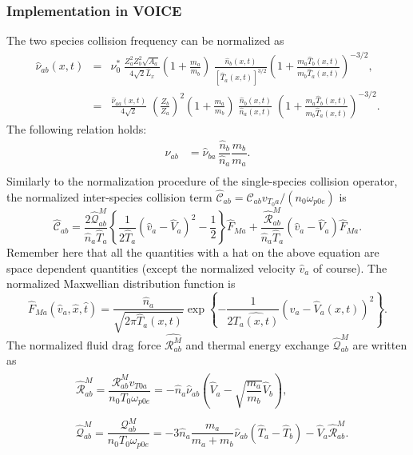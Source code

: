 \documentclass[11pt]{article}
\begin{document}
\subsubsection{Implementation in VOICE}
The two species collision frequency can be normalized as
%
\begin{eqnarray}
	\hat\nu_{ab}(x,t) 
    &=& \nu^*_0\; \frac{Z_a^2Z_b^2 \sqrt{A_a}}{4 \sqrt{2} \hat L_x} \left(1+\frac{m_a}{m_b}\right)\; 
        \frac{\hat n_b(x,t)}{[\hat T_a(x,t)]^{3/2}} 
        \left(1+\frac{m_a\hat T_b(x,t)}{m_b \hat T_a(x,t)}\right)^{-3/2}, \nonumber\\
    &=& \frac{\hat\nu_{aa}(x,t)}{4\sqrt{2}}\; \left(\frac{Z_b}{Z_a}\right)^2
        \left(1+\frac{m_a}{m_b}\right)\; 
        \frac{\hat n_b(x,t)}{\hat n_a(x,t)}\;
        \left(1+\frac{m_a\hat T_b(x,t)}{m_b \hat T_a(x,t)}\right)^{-3/2}.
\end{eqnarray}
%
The following relation holds:
%
\begin{align}
  \hat{\nu}_{ab} & = \hat{\nu}_{ba} \, \dfrac{\hat{n}_b}{\hat{n}_a}   \dfrac{m_b}{m_a}. \\
\end{align}
%
Similarly to the normalization procedure of the single-species collision operator, the normalized inter-species collision term $\hat{\mathcal{C}}_{ab} = \mathcal{C}_{ab} v_{T_0a} / (n_0 \omega_{p0e})$ is 
%
\begin{equation}\label{eq:c_ab_nr}
  \hat{\mathcal{C}}_{ab} = \dfrac{2 \hat{\mathcal{Q}}_{ab}^{M}}{\hat{n}_a \hat{T}_a} \left\{ \dfrac{1}{2 \hat{T}_a} \left( \hat{v}_a - \hat{V}_a \right) ^2 - \dfrac{1}{2}  \right\} \hat{F}_{Ma} + \dfrac{\hat{\mathcal{R}}_{ab}^{M}}{\hat{n}_a \hat{T}_a} \left( \hat{v}_a - \hat{V}_{a} \right) \hat{F}_{Ma}.
\end{equation}
%
Remember here that all the quantities with a hat on the above equation are space dependent quantities (except the normalized velocity $\hat{v}_a$ of course). The normalized Maxwellian distribution function is
%
\begin{equation}\label{eq:nmz_max}
  \hat{F}_{Ma}(\hat{v}_a, \hat{x}, \hat{t}) = \dfrac{\hat{n}_a}{\sqrt{  2\pi \hat{T}_a(x,t) }} \operatorname{exp} \left\{- \dfrac{1}{2\hat{ T_a(x,t)}}(\hat{v}_a - \hat{V}_{a}(x,t))^2 \right\}.
\end{equation}
%
The normalized fluid drag force $\hat{\mathcal{R}_{ab}^{M}}$ and thermal energy exchange $\hat{\mathcal{Q}}_{ab}^{M}$ are written as 
%
  \begin{align}
 & \begin{aligned}
    \hat{\mathcal{R}}_{ab}^{M} = \dfrac{\mathcal{R}_{ab}^{M} v_{T 0 a}}{n_0 T_0 \omega_{p 0e}} = - \hat{n}_a \hat{\nu}_{ab} \left( \hat{V}_a - \sqrt{\dfrac{m_a}{m_b}} \hat{V}_b  \right),
\end{aligned}\\
 & \begin{aligned}
   \hat{\mathcal{Q}}_{ab}^{M} = \dfrac{\mathcal{Q}_{ab}^{M}}{n_0 T_0 \omega_{p 0e}} = - 3 \hat{n}_a \dfrac{m_a}{m_a + m_b} \hat{\nu}_{ab} \left( \hat{T}_a - \hat{T}_b \right) - \hat{V}_a \hat{\mathcal{R}}_{ab}^{M}.
 \end{aligned}
  \end{align}
\end{document}
